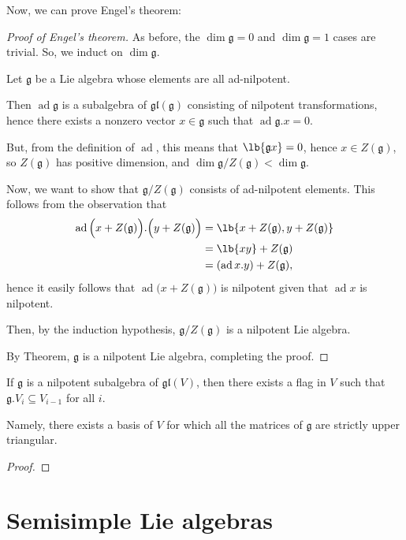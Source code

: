 \documentclass{article}
\DeclarePairedDelimiter\lb\lbrack\rbrack
\DeclareMathOperator{\ad}{ad}
\newcommand*\frkg{{\ensuremath{\mathfrak{g}}}}
\newcommand*\gl{\ensuremath{\mathfrak{gl}}}
\newcommand*\acts{.}
\begin{document}
Now, we can prove Engel's theorem:

\begin{proof}[Proof of Engel's theorem]
    As before, the $\dim \frkg = 0$ and $\dim \frkg = 1$ cases are trivial.
    So, we induct on $\dim \frkg$.

    Let $\frkg$ be a Lie algebra whose elements are all ad-nilpotent.

    Then $\ad \frkg$ is a subalgebra of $\gl(\frkg)$ consisting of nilpotent transformations, hence there exists a nonzero vector $x \in \frkg$ such that $\ad \frkg \acts x = 0$.

    But, from the definition of $\ad$, this means that $\lb{\frkg x} = 0$, hence $x \in Z(\frkg)$, so $Z(\frkg)$ has positive dimension, and $\dim \frkg / Z(\frkg) < \dim \frkg$.

    Now, we want to show that $\frkg/Z(\frkg)$ consists of ad-nilpotent elements.
    This follows from the observation that
    \begin{align*}
        \ad \Big(x + Z(\frkg)\Big) \acts \Big(y + Z(\frkg)\Big)
        &= 
        \lb{x + Z(\frkg), y + Z(\frkg)} 
        \\
        &= \lb{xy} + Z(\frkg) 
        \\
        &= (\ad x \acts y) + Z(\frkg),
    \end{align*}
    hence it easily follows that $\ad \Big(x + Z(\frkg)\Big)$ is nilpotent given that $\ad x$ is nilpotent.
    
    Then, by the induction hypothesis, $\frkg/Z(\frkg)$ is a nilpotent Lie algebra.

    By Theorem, $\frkg$ is a nilpotent Lie algebra, completing the proof.
\end{proof}

\begin{corollary}
    If $\frkg$ is a nilpotent subalgebra of $\gl(V)$, then there exists a flag in $V$ such that $\frkg \acts V_i \subseteq V_{i-1}$ for all $i$.

    Namely, there exists a basis of $V$ for which all the matrices of $\frkg$ are strictly upper triangular.
\end{corollary}

\begin{proof}
\end{proof}

\section{Semisimple Lie algebras}
\end{document}
